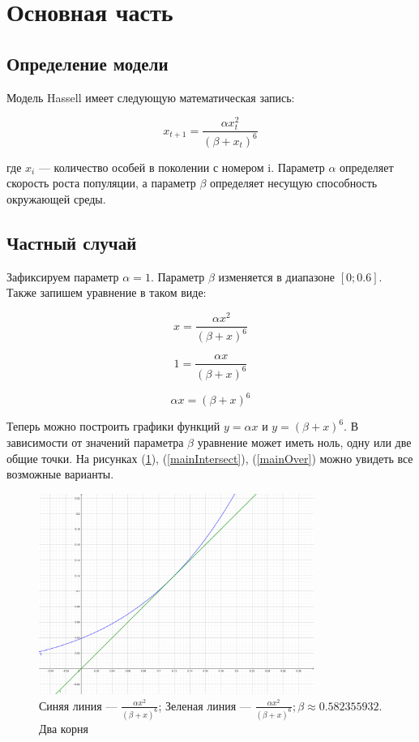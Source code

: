 
\section{Основная часть}

    \subsection{Определение модели}

        Модель Hassell имеет следующую математическая запись:

        \[x_{t+1} = \frac{\alpha x_t^2}{(\beta + x_t)^6}\]

        где \(x_i\) --- количество особей в поколении с номером i. Параметр \(\alpha\) определяет скорость роста популяции, а параметр \(\beta\) определяет несущую способность окружающей среды.
    
    \subsection{Частный случай}
    
        Зафиксируем параметр \(\alpha = 1\). Параметр \(\beta\) изменяется в диапазоне \([0; 0.6]\). Также запишем уравнение в таком виде:

        \[x = \frac{\alpha x^2}{(\beta + x)^6}\]
    
        \[1 = \frac{\alpha x}{(\beta + x)^6}\]

        \[\alpha x = (\beta + x)^6\]

        Теперь можно построить графики функций \(y = \alpha x\) и \(y = (\beta + x)^6\). В зависимости от значений параметра \(\beta\) уравнение может иметь ноль, одну или две общие точки. На рисунках (\ref{mainTouch}), (\ref{mainIntersect}), (\ref{mainOver}) можно увидеть все возможные варианты.

        \begin{figure}[h!]
            \centering
            \includegraphics[width=0.8\textwidth]{images/main_touch.jpg}

            \caption{Синяя линия --- \(\frac{\alpha x^2}{(\beta + x)^6}\); Зеленая линия --- \(\frac{\alpha x^2}{(\beta + x)^6}; \beta \approx 0.582355932\). Два корня}
            \label{mainTouch}
        \end{figure}
        
